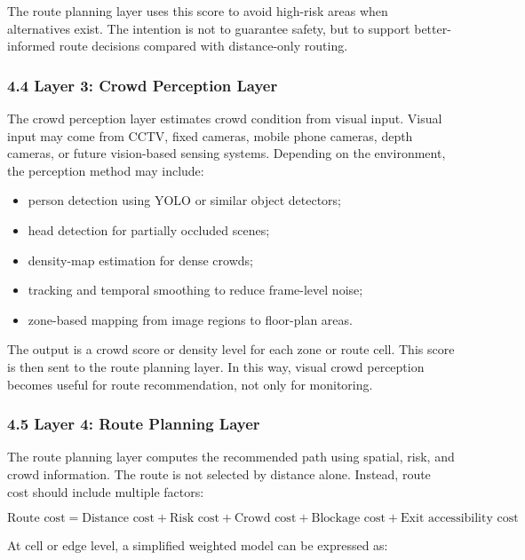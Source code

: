 \documentclass[
]{article}
\providecommand{\tightlist}{%
  \setlength{\itemsep}{0pt}\setlength{\parskip}{0pt}}
\begin{document}
The route planning layer uses this score to avoid high-risk areas when
alternatives exist. The intention is not to guarantee safety, but to
support better-informed route decisions compared with distance-only
routing.

\subsubsection{4.4 Layer 3: Crowd Perception
Layer}\label{layer-3-crowd-perception-layer}

The crowd perception layer estimates crowd condition from visual input.
Visual input may come from CCTV, fixed cameras, mobile phone cameras,
depth cameras, or future vision-based sensing systems. Depending on the
environment, the perception method may include:

\begin{itemize}
\tightlist
\item
  person detection using YOLO or similar object detectors;
\item
  head detection for partially occluded scenes;
\item
  density-map estimation for dense crowds;
\item
  tracking and temporal smoothing to reduce frame-level noise;
\item
  zone-based mapping from image regions to floor-plan areas.
\end{itemize}

The output is a crowd score or density level for each zone or route
cell. This score is then sent to the route planning layer. In this way,
visual crowd perception becomes useful for route recommendation, not
only for monitoring.

\subsubsection{4.5 Layer 4: Route Planning
Layer}\label{layer-4-route-planning-layer}

The route planning layer computes the recommended path using spatial,
risk, and crowd information. The route is not selected by distance
alone. Instead, route cost should include multiple factors:

\[
\text{Route cost} =
\text{Distance cost} + \text{Risk cost} + \text{Crowd cost}
+ \text{Blockage cost} + \text{Exit accessibility cost}
\]

At cell or edge level, a simplified weighted model can be expressed as:
\end{document}
